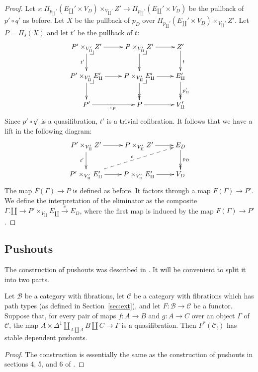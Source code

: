 \documentclass[reqno]{amsart}
\makeatletter
\theoremstyle{definition}
\theoremstyle{remark}
\newcommand{\scat}[1]{\mathcal{#1}}
\numberwithin{figure}{section}
\newcommand{\pb}[1][dr]{\save*!/#1-1.2pc/#1:(-1,1)@^{|-}\restore}
\makeatother
\begin{document}
\begin{proof}
Let $s : \Pi_{p_\amalg'}(E_\amalg' \times V_D) \times_{V_\amalg'} Z' \to \Pi_{p_\amalg'}(E_\amalg' \times V_D)$ be the pullback of $p' \circ q'$ as before.
Let $X$ be the pullback of $p_D$ over $\Pi_{p_\amalg'}(E_\amalg' \times V_D) \times_{V_\amalg'} Z'$.
Let $P = \Pi_s(X)$ and let $t'$ be the pullback of $t$:
\[ \xymatrix{ P' \times_{V_\amalg'} Z' \ar[r] \ar[d]_{t'} \pb   & P \times_{V_\amalg'} Z' \ar[r] \ar[d] \pb                 & Z' \ar[d]^t                           \\
              P' \times_{V_\amalg'} E_\amalg' \ar[r] \ar[d] \pb & P \times_{V_\amalg'} E_\amalg' \ar[r] \ar@{->>}[d] \pb    & E_\amalg' \ar@{->>}[d]^{p_\amalg'}    \\
              P' \ar[r]_{\varepsilon_P}                         & P \ar[r]                                                  & V_\amalg'
            } \]
Since $p' \circ q'$ is a quasifibration, $t'$ is a trivial cofibration.
It follows that we have a lift in the following diagram:
\[ \xymatrix{ P' \times_{V_\amalg'} Z' \ar[r] \ar[d]_{t'}               & P \times_{V_\amalg'} Z' \ar[r]        & E_D \ar@{->>}[d]^{p_D} \\
              P' \times_{V_\amalg'} E_\amalg' \ar[r] \ar@{-->}[urr]^e   & P \times_{V_\amalg'} E_\amalg' \ar[r] & V_D
            } \]
The map $F(\Gamma) \to P$ is defined as before.
It factors through a map $F(\Gamma) \to P'$.
We define the interpretation of the eliminator as the composite $\Gamma.\amalg \to P' \times_{V_\amalg} E_\amalg \xrightarrow{e} E_D$, where the first map is induced by the map $F(\Gamma) \to P'$.
\end{proof}

\subsection{Pushouts}

The construction of pushouts was described in \cite{lum-shul-hits}.
It will be convenient to split it into two parts.

\begin{lem}[pushouts]
Let $\scat{B}$ be a category with fibrations, let $\scat{C}$ be a category with fibrations which has path types (as defined in Section~\ref{sec:ext}), and let $F : \scat{B} \to \scat{C}$ be a functor.
Suppose that, for every pair of maps $f : A \to B$ and $g : A \to C$ over an object $\Gamma$ of $\scat{C}$, the map $A \times \Delta^1 \amalg_{A \amalg A} B \amalg C \to \Gamma$ is a quasifibration.
Then $F^*(\scat{C}_!)$ has stable dependent pushouts.
\end{lem}
\begin{proof}
The construction is essentially the same as the construction of pushouts in sections 4, 5, and 6 of \cite{lum-shul-hits}.
\end{proof}
\end{document}
